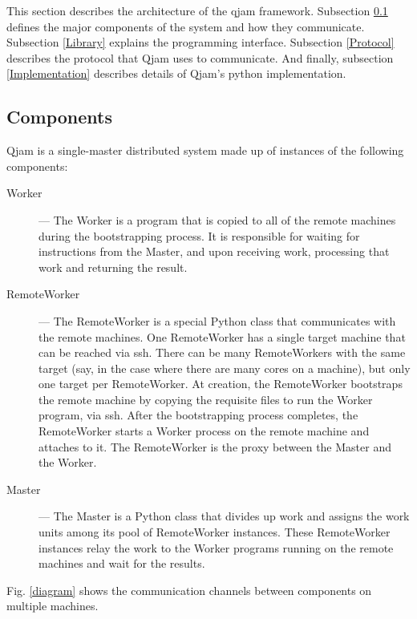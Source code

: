 \documentclass[%
  final,
  notitlepage,
  narroweqnarray,
  inline,
]{ieee}
\begin{document}
This section describes the architecture of the qjam framework. Subsection
\ref{Components} defines the major components of the system and how they
communicate. Subsection \ref{Library} explains the programming interface.
Subsection \ref{Protocol} describes the protocol that Qjam uses to communicate.
And finally, subsection \ref{Implementation} describes details of Qjam's
python implementation.


\subsection{Components}
\label{Components}

Qjam is a single-master distributed system made up of instances of the
following components: \\

\begin{description}
  \item[Worker] --- The Worker is a program that is copied to all of the remote
    machines during the bootstrapping process. It is responsible for waiting
    for instructions from the Master, and upon receiving work, processing that
    work and returning the result. \\

  \item[RemoteWorker] --- The RemoteWorker is a special Python class that
    communicates with the remote machines. One RemoteWorker has a single target
    machine that can be reached via ssh. There can be many RemoteWorkers with
    the same target (say, in the case where there are many cores on a machine),
    but only one target per RemoteWorker. At creation, the RemoteWorker
    bootstraps the remote machine by copying the requisite files to run the
    Worker program, via ssh. After the bootstrapping process completes, the
    RemoteWorker starts a Worker process on the remote machine and attaches to
    it. The RemoteWorker is the proxy between the Master and the Worker. \\

  \item[Master] --- The Master is a Python class that divides up work and
    assigns the work units among its pool of RemoteWorker instances. These
    RemoteWorker instances relay the work to the Worker programs running on the
    remote machines and wait for the results. \\
\end{description}

Fig. \ref{diagram} shows the communication channels between components on
multiple machines.
\end{document}

